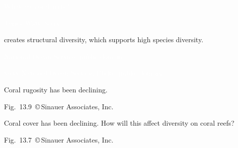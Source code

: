 \documentclass[t]{beamer}
\begin{document}


{
\begin{frame}[b]{\hfill\textcolor{white}{What are coral reefs?}}

\hfill \tiny \textcolor{white}{James Watt, \textsc{noaa}}
\end{frame}
}

%
{
\begin{frame}[b]{ creates structural diversity, which supports high species diversity.}

\hfill \tiny \textcolor{white}{National Ocean Service, public domain}
\end{frame}
}
%
{
\begin{frame}[b]

\hfill \tiny \textcolor{white}{\textsc{noaa} National Ocean Service, Flickr, public domain}
\end{frame}
}

%
{
\begin{frame}[b]{Coral rugosity has been declining.}

	\hfill \tiny Fig.~13.9~\copyright\,Sinauer Associates, Inc.

\end{frame}
}

%
{
\begin{frame}[b]{Coral cover has been declining. How will this affect diversity on coral reefs?}

	\hfill \tiny Fig.~13.7~\copyright\,Sinauer Associates, Inc.

\end{frame}
}
\end{document}
